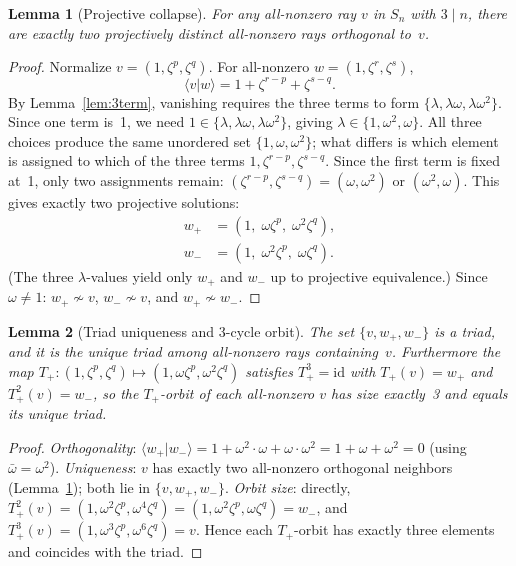 \documentclass[twocolumn,prl,superscriptaddress,nofootinbib]{revtex4-2}
\newtheorem{lemma}{Lemma}
\begin{document}
\begin{lemma}[Projective collapse]\label{lem:collapse}
For any all-nonzero ray $v$ in $S_n$ with $3 \mid n$, there are exactly two projectively distinct all-nonzero rays orthogonal to~$v$.
\end{lemma}

\begin{proof}
Normalize $v = (1, \zeta^p, \zeta^q)$.  For all-nonzero $w = (1, \zeta^r, \zeta^s)$,
\[
\langle v | w \rangle = 1 + \zeta^{r-p} + \zeta^{s-q}.
\]
By Lemma~\ref{lem:3term}, vanishing requires the three terms to form $\{\lambda, \lambda\omega, \lambda\omega^2\}$.  Since one term is~1, we need $1 \in \{\lambda, \lambda\omega, \lambda\omega^2\}$, giving $\lambda \in \{1, \omega^2, \omega\}$.  All three choices produce the same unordered set $\{1, \omega, \omega^2\}$; what differs is which element is assigned to which of the three terms $1, \zeta^{r-p}, \zeta^{s-q}$.  Since the first term is fixed at~1, only two assignments remain: $(\zeta^{r-p}, \zeta^{s-q}) = (\omega, \omega^2)$ or $(\omega^2, \omega)$.  This gives exactly two projective solutions:
\begin{align*}
w_+ &= (1,\; \omega\zeta^p,\; \omega^2\zeta^q), \\
w_- &= (1,\; \omega^2\zeta^p,\; \omega\zeta^q).
\end{align*}
(The three $\lambda$-values yield only $w_+$ and $w_-$ up to projective equivalence.)  Since $\omega \neq 1$: $w_+ \not\sim v$, $w_- \not\sim v$, and $w_+ \not\sim w_-$.
\end{proof}

\begin{lemma}[Triad uniqueness and 3-cycle orbit]\label{lem:unique}
The set $\{v, w_+, w_-\}$ is a triad, and it is the unique triad among all-nonzero rays containing~$v$.  Furthermore the map $T_+: (1, \zeta^p, \zeta^q) \mapsto (1, \omega\zeta^p, \omega^2\zeta^q)$ satisfies $T_+^3 = \mathrm{id}$ with $T_+(v) = w_+$ and $T_+^2(v) = w_-$, so the $T_+$-orbit of each all-nonzero $v$ has size exactly~3 and equals its unique triad.
\end{lemma}

\begin{proof}
\emph{Orthogonality}: $\langle w_+ | w_- \rangle = 1 + \omega^2 \cdot \omega + \omega \cdot \omega^2 = 1 + \omega + \omega^2 = 0$ (using $\bar\omega = \omega^2$).  \emph{Uniqueness}: $v$ has exactly two all-nonzero orthogonal neighbors (Lemma~\ref{lem:collapse}); both lie in $\{v, w_+, w_-\}$.  \emph{Orbit size}: directly, $T_+^2(v) = (1, \omega^2\zeta^p, \omega^4\zeta^q) = (1, \omega^2\zeta^p, \omega\zeta^q) = w_-$, and $T_+^3(v) = (1, \omega^3\zeta^p, \omega^6\zeta^q) = v$.  Hence each $T_+$-orbit has exactly three elements and coincides with the triad.
\end{proof}
\end{document}
